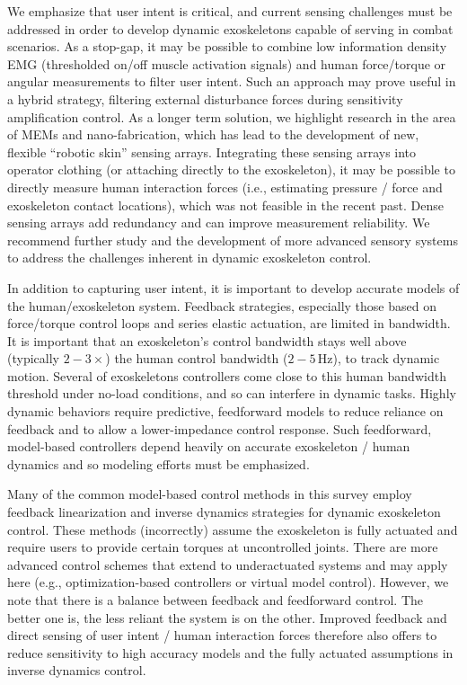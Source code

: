 \documentclass[letterpaper,12pt,fullpage]{article}
\begin{document}
We emphasize that user intent is critical, and current sensing challenges must be addressed in order to develop dynamic exoskeletons capable of serving in combat scenarios.  As a stop-gap, it may be possible to combine low information density EMG (thresholded on/off muscle activation signals) and human force/torque or angular measurements to filter user intent.  Such an approach may prove useful in a hybrid strategy, filtering external disturbance forces during sensitivity amplification control.  As a longer term solution, we highlight research in the area of MEMs and nano-fabrication, which has lead to the development of new, flexible ``robotic skin'' sensing arrays.  Integrating these sensing arrays into operator clothing (or attaching directly to the exoskeleton), it may be possible to directly measure human interaction forces (i.e., estimating pressure / force and exoskeleton contact locations), which was not feasible in the recent past.  Dense sensing arrays add redundancy and can improve measurement reliability. We recommend further study and the development of more advanced sensory systems to address the challenges inherent in dynamic exoskeleton control.

In addition to capturing user intent, it is important to develop accurate models of the human/exoskeleton system.  Feedback strategies, especially those based on force/torque control loops and series elastic actuation, are limited in bandwidth. 
%
It is important that an exoskeleton's control bandwidth stays well above (typically $2-3\times$) the human control bandwidth ($2-5\,$Hz), to track dynamic motion.  Several of exoskeletons controllers come close to this human bandwidth threshold under no-load conditions, and so can interfere in dynamic tasks.
%
Highly dynamic behaviors require predictive, feedforward models to reduce reliance on feedback and to allow a lower-impedance control response.  
Such feedforward, model-based controllers depend heavily on accurate exoskeleton / human dynamics and so modeling efforts must be emphasized.

Many of the common model-based control methods in this survey employ feedback linearization and inverse dynamics strategies for dynamic exoskeleton control.  
These methods (incorrectly) assume the exoskeleton is fully actuated and require users to provide certain torques at uncontrolled joints.  There are more advanced control schemes that extend to underactuated systems and may apply here (e.g., optimization-based controllers or virtual model control).  However, we note that there is a balance between feedback and feedforward control.  The better one is, the less reliant the system is on the other.
Improved feedback and direct sensing of user intent / human interaction forces therefore also offers to reduce sensitivity to high accuracy models and the fully actuated assumptions in inverse dynamics control. 


\newpage


\end{document}
